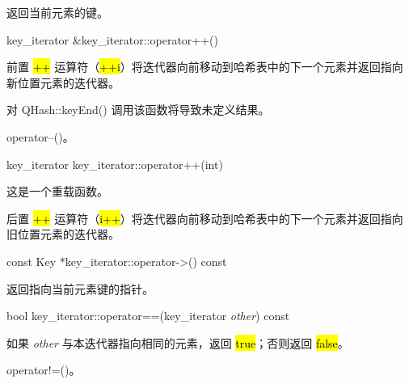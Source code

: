 返回当前元素的键。

key\_iterator \&key\_iterator::operator++()

前置 \hl{++} 运算符（\hl{++i}）将迭代器向前移动到哈希表中的下一个元素并返回指向新位置元素的迭代器。

对 QHash::keyEnd() 调用该函数将导致未定义结果。



\begin{seeAlso}
operator--()。
\end{seeAlso}


key\_iterator key\_iterator::operator++(int)

这是一个重载函数。

后置 \hl{++} 运算符（\hl{i++}）将迭代器向前移动到哈希表中的下一个元素并返回指向旧位置元素的迭代器。

const Key *key\_iterator::operator->() const

返回指向当前元素键的指针。

bool key\_iterator::operator==(key\_iterator \emph{other}) const

如果 \emph{other} 与本迭代器指向相同的元素，返回 \hl{true}；否则返回 \hl{false}。


\begin{seeAlso}
operator!=()。
\end{seeAlso}

